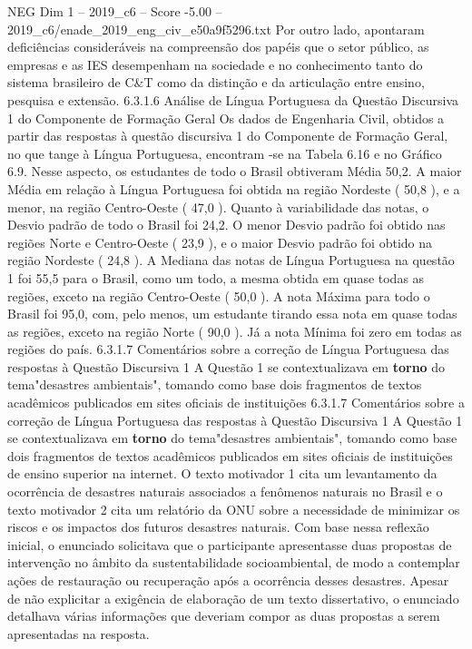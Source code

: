 \begin{textsample}{NEG Dim 1 – 2019\_c6 – Score -5.00 – 2019\_c6/enade\_2019\_eng\_civ\_e50a9f5296.txt}
Por outro lado, apontaram deficiências consideráveis na compreensão dos papéis que o setor público, as empresas e as IES desempenham na sociedade e no conhecimento tanto do sistema brasileiro de C\&T como da distinção e da articulação entre ensino, pesquisa e extensão. 6.3.1.6 Análise de Língua Portuguesa da Questão Discursiva 1 do Componente de Formação Geral Os dados de Engenharia Civil, obtidos a partir das respostas à questão discursiva 1 do Componente de Formação Geral, no que tange à Língua Portuguesa, encontram -se na Tabela 6.16 e no Gráfico 6.9.
Nesse aspecto, os estudantes de todo o Brasil obtiveram Média 50,2.
A maior Média em relação à Língua Portuguesa foi obtida na região Nordeste ( 50,8 ), e a menor, na região Centro-Oeste ( 47,0 ).
Quanto à variabilidade das notas, o Desvio padrão de todo o Brasil foi 24,2.
O menor Desvio padrão foi obtido nas regiões Norte e Centro-Oeste ( 23,9 ), e o maior Desvio padrão foi obtido na região Nordeste ( 24,8 ).
A Mediana das notas de Língua Portuguesa na questão 1 foi 55,5 para o Brasil, como um todo, a mesma obtida em quase todas as regiões, exceto na região Centro-Oeste ( 50,0 ).
A nota Máxima para todo o Brasil foi 95,0, com, pelo menos, um estudante tirando essa nota em quase todas as regiões, exceto na região Norte ( 90,0 ).
Já a nota Mínima foi zero em todas as regiões do país. 6.3.1.7 Comentários sobre a correção de Língua Portuguesa das respostas à Questão Discursiva 1 A Questão 1 se contextualizava em \textbf{torno} do tema"desastres ambientais", tomando como base dois fragmentos de textos acadêmicos publicados em sites oficiais de instituições 6.3.1.7 Comentários sobre a correção de Língua Portuguesa das respostas à Questão Discursiva 1 A Questão 1 se contextualizava em \textbf{torno} do tema"desastres ambientais", tomando como base dois fragmentos de textos acadêmicos publicados em sites oficiais de instituições de ensino superior na internet.
O texto motivador 1 cita um levantamento da ocorrência de desastres naturais associados a fenômenos naturais no Brasil e o texto motivador 2 cita um relatório da ONU sobre a necessidade de minimizar os riscos e os impactos dos futuros desastres naturais.
Com base nessa reflexão inicial, o enunciado solicitava que o participante apresentasse duas propostas de intervenção no âmbito da sustentabilidade socioambiental, de modo a contemplar ações de restauração ou recuperação após a ocorrência desses desastres.
Apesar de não explicitar a exigência de elaboração de um texto dissertativo, o enunciado detalhava várias informações que deveriam compor as duas propostas a serem apresentadas na resposta.

\end{textsample}
